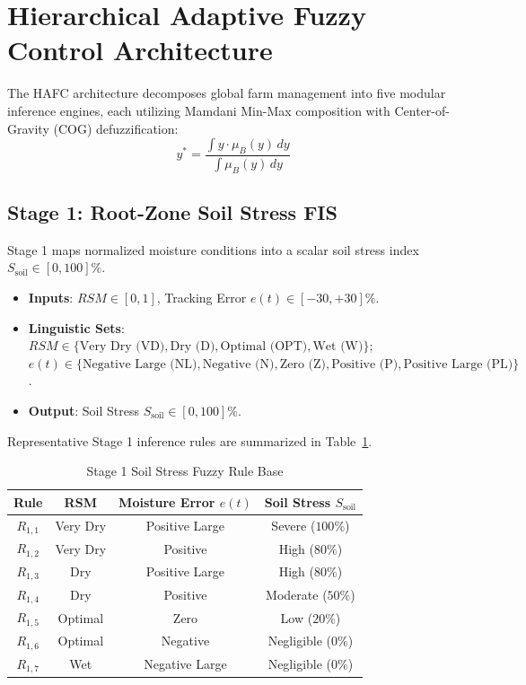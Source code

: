 \documentclass[conference]{IEEEtran}
\begin{document}
\section{Hierarchical Adaptive Fuzzy Control Architecture}

The HAFC architecture decomposes global farm management into five modular inference engines, each utilizing Mamdani Min-Max composition with Center-of-Gravity (COG) defuzzification:
\begin{equation}
y^* = \frac{\int y \cdot \mu_B(y) \, dy}{\int \mu_B(y) \, dy}
\label{eq:cog}
\end{equation}

\subsection{Stage 1: Root-Zone Soil Stress FIS}
Stage 1 maps normalized moisture conditions into a scalar soil stress index $S_{\text{soil}} \in [0, 100]\%$.
\begin{itemize}
    \item \textbf{Inputs}: $RSM \in [0, 1]$, Tracking Error $e(t) \in [-30, +30]\%$.
    \item \textbf{Linguistic Sets}: $RSM \in \{\text{Very Dry (VD)}, \text{Dry (D)}, \text{Optimal (OPT)}, \text{Wet (W)}\}$; $e(t) \in \{\text{Negative Large (NL)}, \text{Negative (N)}, \text{Zero (Z)}, \text{Positive (P)}, \text{Positive Large (PL)}\}$.
    \item \textbf{Output}: Soil Stress $S_{\text{soil}} \in [0, 100]\%$.
\end{itemize}

Representative Stage 1 inference rules are summarized in Table~\ref{tab:stage1_rules}.

\begin{table}[htbp]
\caption{Stage 1 Soil Stress Fuzzy Rule Base}
\begin{center}
\begin{tabular}{cccc}
\toprule
\textbf{Rule} & \textbf{RSM} & \textbf{Moisture Error $e(t)$} & \textbf{Soil Stress $S_{\text{soil}}$} \\
\midrule
$R_{1,1}$ & Very Dry & Positive Large & Severe ($100\%$) \\
$R_{1,2}$ & Very Dry & Positive & High ($80\%$) \\
$R_{1,3}$ & Dry & Positive Large & High ($80\%$) \\
$R_{1,4}$ & Dry & Positive & Moderate ($50\%$) \\
$R_{1,5}$ & Optimal & Zero & Low ($20\%$) \\
$R_{1,6}$ & Optimal & Negative & Negligible ($0\%$) \\
$R_{1,7}$ & Wet & Negative Large & Negligible ($0\%$) \\
\bottomrule
\end{tabular}
\label{tab:stage1_rules}
\end{center}
\end{table}
\end{document}
